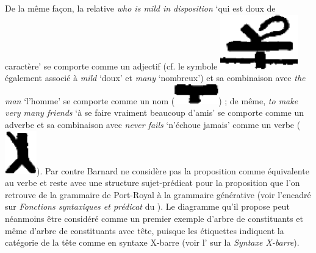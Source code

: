 {    De la même façon, la relative \textit{who is mild in disposition} ‘qui est doux de caractère’ se comporte comme un adjectif (cf. le symbole \includegraphics[height=1.25ex]{figures/vol1syntaxe2-img020.png} également associé à \textit{mild} ‘doux’ et \textit{many} ‘nombreux’) et sa combinaison avec \textit{the man} ‘l’homme’ se comporte comme un nom (\includegraphics[height=1.25ex]{figures/vol1syntaxe2-img021.png}) ; de même, \textit{to make very many friends} ‘à se faire vraiment beaucoup d’amis’ se comporte comme un adverbe et sa combinaison avec \textit{never fails} ‘n’échoue jamais’ comme un verbe (\includegraphics[height=1.25ex]{figures/vol1syntaxe2-img022.png}). Par contre Barnard ne considère pas la proposition comme équivalente au verbe et reste avec une structure sujet-prédicat pour la proposition que l’on retrouve de la grammaire de Port-Royal à la grammaire générative (voir l’encadré sur \textit{Fonctions syntaxiques et prédicat} du ). Le diagramme qu’il propose peut néanmoins être considéré comme un premier exemple d’arbre de constituants et même d’arbre de constituants avec tête, puisque les étiquettes indiquent la catégorie de la tête comme en syntaxe X-barre (voir l’ sur la \textit{Syntaxe X-barre}).




}
